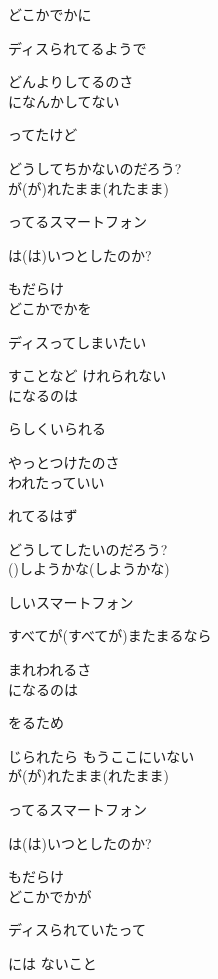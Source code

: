 どこかでかに

ディスられてるようで

どんよりしてるのさ
\\

になんかしてない

ってたけど

どうしてちかないのだろう?
\\

が(が)れたまま(れたまま)

ってるスマートフォン

は(は)いつとしたのか?

もだらけ
\\

どこかでかを

ディスってしまいたい

すことなど けれられない
\\

になるのは

らしくいられる

やっとつけたのさ
\\

われたっていい

れてるはず

どうしてしたいのだろう?
\\

()しようかな(しようかな)

しいスマートフォン

すべてが(すべてが)またまるなら

まれわれるさ
\\

になるのは

をるため

じられたら もうここにいない
\\

が(が)れたまま(れたまま)

ってるスマートフォン

は(は)いつとしたのか?

もだらけ
\\

どこかでかが

ディスられていたって

には ないこと
\\

